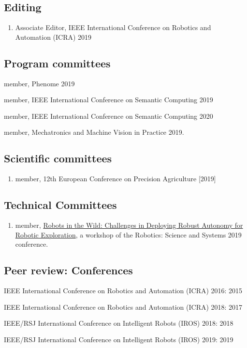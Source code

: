 \documentclass[letterpaper,11pt]{article}
\begin{document}
\subsection{Editing}
\begin{enumerate}[noitemsep, leftmargin=*,label={}]
\item{Associate Editor, IEEE International Conference on Robotics and Automation (ICRA) 2019}
\end{enumerate}

\subsection{Program committees}
\begin{enumerate}[noitemsep, leftmargin=*,label={[\arabic*]}]
\item{member, Phenome 2019}
\item{member, IEEE International Conference on Semantic Computing 2019}
\item{member, IEEE International Conference on Semantic Computing 2020}
\item{member, Mechatronics and Machine Vision in Practice 2019.}
\end{enumerate}

\subsection{Scientific committees}
\begin{enumerate}[noitemsep, leftmargin=*,label={}]
\item{member, 12th European Conference on Precision Agriculture [2019]}
\end{enumerate}

\subsection{Technical Committees}
\begin{enumerate}[noitemsep, leftmargin=*,label={}]
\item{member, \href{https://robots-wild-rss.github.io/rss2019-workshop/}{Robots in the Wild: Challenges in Deploying Robust Autonomy for Robotic Exploration}, a workshop of the Robotics: Science and Systems 2019 conference.}
\end{enumerate}


\subsection{Peer review: Conferences}
\begin{enumerate}[noitemsep, leftmargin=*,label={[\arabic*]}]
\item{IEEE International Conference on Robotics and Automation (ICRA) 2016: 2015}
\item{IEEE International Conference on Robotics and Automation (ICRA) 2018: 2017}
\item{IEEE/RSJ International Conference on Intelligent Robots (IROS) 2018: 2018}
\item{IEEE/RSJ International Conference on Intelligent Robots (IROS) 2019: 2019}
\end{enumerate}
\end{document}
